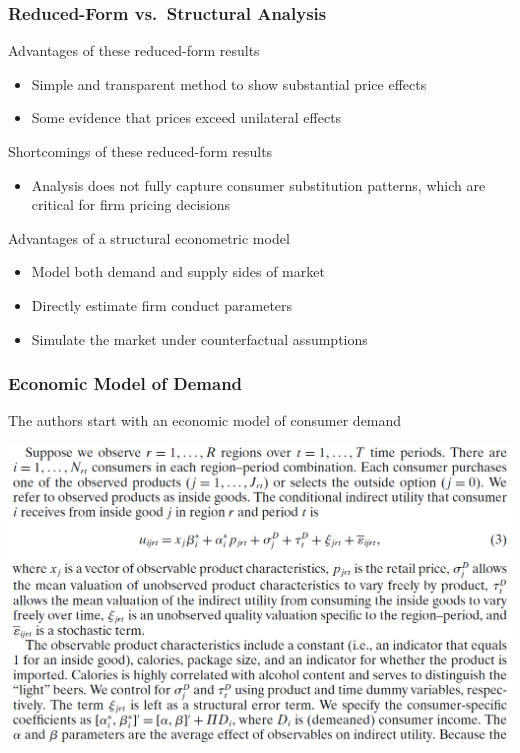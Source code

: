 \documentclass{beamer}
\begin{document}
\begin{frame}\frametitle{Reduced-Form vs.\ Structural Analysis}
    Advantages of these reduced-form results
    \begin{itemize}
        \item Simple and transparent method to show substantial price effects
        \item Some evidence that prices exceed unilateral effects
    \end{itemize}
    \vspace{2ex}
    Shortcomings of these reduced-form results
    \begin{itemize}
        \item Analysis does not fully capture consumer substitution patterns, which are critical for firm pricing decisions
    \end{itemize}
    \vspace{2ex}
    Advantages of a structural econometric model
    \begin{itemize}
        \item Model both demand and supply sides of market
        \item Directly estimate firm conduct parameters
        \item Simulate the market under counterfactual assumptions
    \end{itemize}
\end{frame} 

\begin{frame}\frametitle{Economic Model of Demand}
    The authors start with an economic model of consumer demand
    \begin{center}
        \includegraphics[width=0.95\linewidth]{eq_3}
    \end{center}    
\end{frame}
\end{document}
